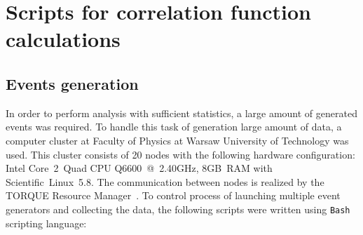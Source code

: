 %
\chapter{Scripts for correlation function calculations}
  \section{Events generation}
    In order to perform analysis with sufficient statistics, a large amount of generated events was required.
    To handle this task of generation large amount of data, a computer cluster at Faculty of Physics at Warsaw University of Technology was used.
    This cluster consists of 20 nodes with the following hardware configuration: \mbox{Intel\textregistered} \mbox{Core\texttrademark~2 Quad} CPU \mbox{Q6600 @ 2.40GHz,} \mbox{8GB RAM} with Scientific~Linux~5.8.
    The communication between nodes is realized by the TORQUE Resource Manager~\cite{torque}.
    To control process of launching multiple event generators and collecting the data, the following scripts were written using \verb|Bash| scripting language:

